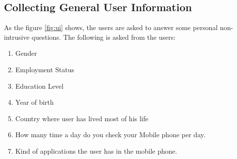 \subsection{Collecting General User Information}
As the figure \ref{fig:ui} shows, the users are asked to answer some personal non-intrusive questions. The following is asked from the users: 
\begin{enumerate}
    \item Gender
    \item Employment Status
    \item Education Level
    \item Year of birth
    \item Country where user has lived most of his life
    \item How many time a day do you check your Mobile phone per day.
    \item Kind of applications the user has in the mobile phone.
\end{enumerate}

